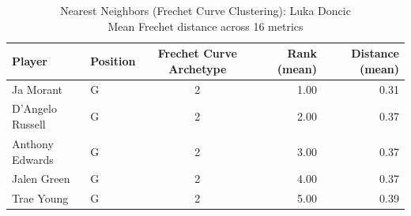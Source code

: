 \begin{table}[t]
\caption*{
{\fontsize{20}{25} Nearest Neighbors (Frechet Curve Clustering): Luka Doncic\fontsize{12}{15}\selectfont } \\ 
{\fontsize{14}{17}\selectfont  Mean Frechet distance across 16 metrics\fontsize{12}{15}\selectfont }
} 
\fontsize{12.0pt}{14.0pt}\selectfont
\begin{tabular*}{\linewidth}{@{\extracolsep{\fill}}llcrr}
\toprule
Player & Position & Frechet Curve Archetype & Rank (mean) & Distance (mean) \\ 
\midrule\addlinespace[2.5pt]
Ja Morant & G & 2 & 1.00 & 0.31 \\ 
D'Angelo Russell & G & 2 & 2.00 & 0.37 \\ 
Anthony Edwards & G & 2 & 3.00 & 0.37 \\ 
Jalen Green & G & 2 & 4.00 & 0.37 \\ 
Trae Young & G & 2 & 5.00 & 0.39 \\ 
\bottomrule
\end{tabular*}
\end{table}

